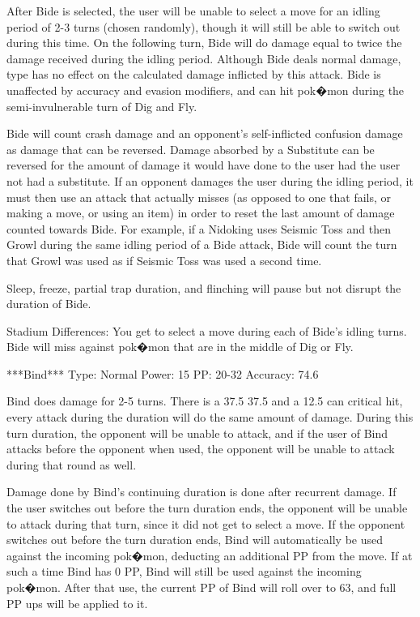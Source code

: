 \documentclass[reprint, aps, prl, paper=A4]{revtex4-1}
\begin{document}
After Bide is selected, the user will be unable to select a move for an idling period of 2-3
turns (chosen randomly), though it will still be able to switch out during this time. On the
following turn, Bide will do damage equal to twice the damage received during the idling
period. Although Bide deals normal damage, type has no effect on the calculated damage
inflicted by this attack. Bide is unaffected by accuracy and evasion modifiers, and can hit
pok�mon during the semi-invulnerable turn of Dig and Fly.

Bide will count crash damage and an opponent's self-inflicted confusion damage as damage that
can be reversed. Damage absorbed by a Substitute can be reversed for the amount of damage it
would have done to the user had the user not had a substitute. If an opponent damages the user
during the idling period, it must then use an attack that actually misses (as opposed to one
that fails, or making a move, or using an item) in order to reset the last amount of damage
counted towards Bide. For example, if a Nidoking uses Seismic Toss and then Growl during the
same idling period of a Bide attack, Bide will count the turn that Growl was used as if Seismic
Toss was used a second time.

Sleep, freeze, partial trap duration, and flinching will pause but not disrupt the duration of
Bide.

Stadium Differences:
You get to select a move during each of Bide's idling turns. Bide will miss against pok�mon
that are in the middle of Dig or Fly.


***Bind***
Type: Normal
Power: 15
PP: 20-32
Accuracy: 74.6%

Bind does damage for 2-5 turns. There is a 37.5%
37.5%
and a 12.5%
can critical hit, every attack during the duration will do the same amount of damage. During
this turn duration, the opponent will be unable to attack, and if the user of Bind attacks
before the opponent when used, the opponent will be unable to attack during that round as well.

Damage done by Bind's continuing duration is done after recurrent damage. If the user switches
out before the turn duration ends, the opponent will be unable to attack during that turn,
since it did not get to select a move. If the opponent switches out before the turn duration
ends, Bind will automatically be used against the incoming pok�mon, deducting an additional PP
from the move. If at such a time Bind has 0 PP, Bind will still be used against the incoming
pok�mon. After that use, the current PP of Bind will roll over to 63, and full PP ups will be
applied to it.
\end{document}
